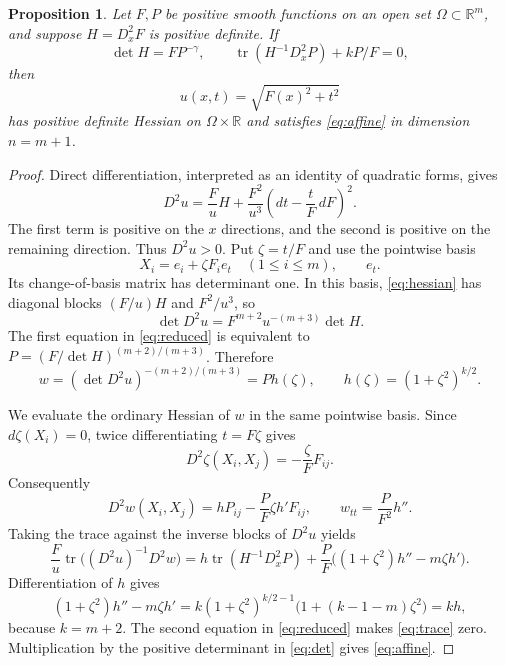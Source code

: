 \documentclass[11pt]{article}
\newcommand{\R}{\mathbb R}
\DeclareMathOperator{\tr}{tr}
\newtheorem{proposition}[theorem]{Proposition}
\theoremstyle{remark}
\begin{document}
\begin{proposition}\label{prop:reduction}
Let $F,P$ be positive smooth functions on an open set
$\Omega\subset\R^m$, and suppose $H=D_x^2F$ is positive definite.
If
\begin{equation}\label{eq:reduced}
 \det H=FP^{-\gamma},\qquad
 \tr(H^{-1}D_x^2P)+kP/F=0,
\end{equation}
then
\[
 u(x,t)=\sqrt{F(x)^2+t^2}
\]
has positive definite Hessian on $\Omega\times\R$ and satisfies
\eqref{eq:affine} in dimension $n=m+1$.
\end{proposition}
\begin{proof}
Direct differentiation, interpreted as an identity of quadratic
forms, gives
\begin{equation}\label{eq:hessian}
 D^2u=\frac Fu H+\frac{F^2}{u^3}
          \left(dt-\frac tF\,dF\right)^2.
\end{equation}
The first term is positive on the $x$ directions, and the second
is positive on the remaining direction.  Thus $D^2u>0$.
Put $\zeta=t/F$ and use the pointwise basis
\[
 X_i=e_i+\zeta F_i e_t\quad(1\leq i\leq m),\qquad e_t.
\]
Its change-of-basis matrix has determinant one.  In this basis,
\eqref{eq:hessian} has diagonal blocks $(F/u)H$ and $F^2/u^3$,
so
\begin{equation}\label{eq:det}
 \det D^2u=F^{m+2}u^{-(m+3)}\det H.
\end{equation}
The first equation in \eqref{eq:reduced} is equivalent to
$P=(F/\det H)^{(m+2)/(m+3)}$.  Therefore
\begin{equation}\label{eq:w}
 w=(\det D^2u)^{-(m+2)/(m+3)}=P h(\zeta),
 \qquad h(\zeta)=(1+\zeta^2)^{k/2}.
\end{equation}

We evaluate the ordinary Hessian of $w$ in the same pointwise basis.
Since $d\zeta(X_i)=0$, twice differentiating $t=F\zeta$ gives
\[
 D^2\zeta(X_i,X_j)=-\frac\zeta F F_{ij}.
\]
Consequently
\[
 D^2w(X_i,X_j)=hP_{ij}-\frac PF\zeta h'F_{ij},
 \qquad w_{tt}=\frac P{F^2}h''.
\]
Taking the trace against the inverse blocks of $D^2u$ yields
\begin{equation}\label{eq:trace}
 \frac Fu\tr\bigl((D^2u)^{-1}D^2w\bigr)
 =h\tr(H^{-1}D_x^2P)
  +\frac PF\bigl((1+\zeta^2)h''-m\zeta h'\bigr).
\end{equation}
Differentiation of $h$ gives
\[
 (1+\zeta^2)h''-m\zeta h'
 =k(1+\zeta^2)^{k/2-1}
       \bigl(1+(k-1-m)\zeta^2\bigr)=kh,
\]
because $k=m+2$.  The second equation in \eqref{eq:reduced}
makes \eqref{eq:trace} zero.  Multiplication by the positive
determinant in \eqref{eq:det} gives \eqref{eq:affine}.
\end{proof}
\end{document}
